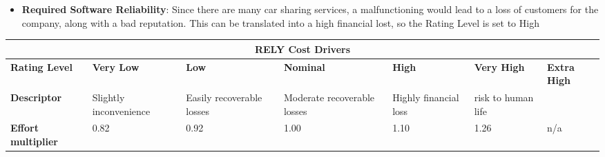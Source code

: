 \begin{itemize}
\item \textbf{Required Software Reliability}:
Since there are many car sharing services, a malfunctioning would lead to a loss of customers for the company, along with a bad reputation. This can be translated into a high financial lost, so the Rating Level is set to High
\end{itemize}
\hspace*{-3cm}\begin{tabular}{|p{3cm}|p{2cm}|p{2cm}|p{2cm}|p{2cm}|p{2cm}|p{2cm}|}
\hline
\multicolumn{7}{|c|}{\textbf{RELY Cost Drivers}}\\
\hline
\hline
\textbf{Rating Level} & \textbf{Very Low} & \textbf{Low} & \textbf{Nominal} & \textbf{High} & \textbf{Very High} & \textbf{Extra High}\\
\hline
\textbf{Descriptor} & Slightly inconvenience & Easily recoverable losses & Moderate recoverable losses & Highly financial loss & risk to human life & \\
\hline
\textbf{Effort multiplier} & 0.82 & 0.92 & 1.00 & 1.10 & 1.26 & n/a\\
\hline 
\end{tabular}